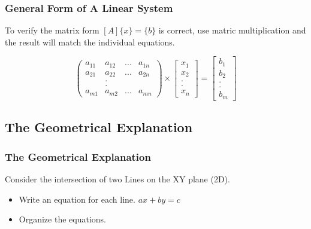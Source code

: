 \documentclass[fleqn]{beamer} %
\newcommand{\sectionIsubsectionIItitle}{General Form of  A Linear System}
\newcommand{\sectionIsubsectionIIItitle}{The Geometrical Explanation}
\begin{document}
			\begin{frame}
				\frametitle{\sectionIsubsectionIItitle} \small
				\bigskip

				To verify the matrix form $[A]\{x\}=\{b\}$ is correct, use matric multiplication and the result will match the individual equations.	

				\begin{fleqn}

					\[ \left( \begin{array}{cccc}
					a_{11} & a_{12} & ...& a_{1n} \\
					a_{21} & a_{22} & ...& a_{2n} \\
					&.&&\\
					&.&&\\
					a_{m1} & a_{m2} & ...& a_{mn}\end{array} \right) \times \left[ \begin{array}{c}
					x_1 \\
					x_2 \\
					.\\
					.\\
					x_n \end{array} \right] = \left[ \begin{array}{c}
					b_1 \\
					b_2 \\
					.\\
					.\\
					b_m \end{array} \right]\] 

				\end{fleqn}


				\btVFill
			\end{frame}

		\subsection{\sectionIsubsectionIIItitle}\label{sectionIsubsectionIII}
			\begin{frame} 
				\frametitle{\sectionIsubsectionIIItitle}
				\bigskip

				 Consider the intersection of two Lines on the XY plane (2D).  \hspace{5mm} 

					\begin{itemize}
	
						\item Write an equation for each line.  $ax+by=c$ \vspace{3mm} \\
	
						\item Organize the equations. \vspace{3mm} \\
					
					\end{itemize}

				\btVFill
			\end{frame}	
\end{document}
